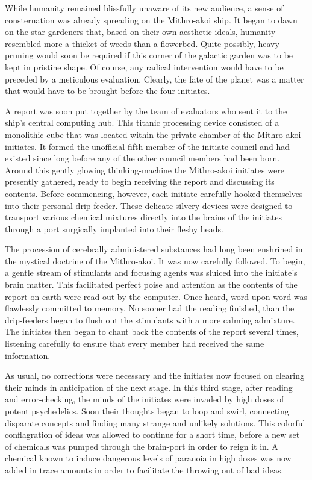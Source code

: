 \documentclass[12pt]{article}
\begin{document}
While humanity remained blissfully unaware of its new audience,
a sense of consternation was already spreading on the Mithro-akoi ship.
It began to dawn on the star gardeners that,
based on their own aesthetic ideals,
humanity resembled more a thicket of weeds than a flowerbed.
Quite possibly, heavy pruning would soon be required if this corner of the galactic garden was to be kept in pristine shape.
Of course, any radical intervention would have to be preceded by a meticulous evaluation.
Clearly, the fate of the planet was a matter that would have to be brought before the four initiates.

A report was soon put together by the team of evaluators who sent it to the ship's central computing hub.
This titanic processing device consisted of a monolithic cube that was located within the private chamber of the Mithro-akoi initiates.
It formed the unofficial fifth member of the initiate council and had existed since long before any of the other council members had been born.
Around this gently glowing thinking-machine the Mithro-akoi initiates were presently gathered, ready to begin receiving the report and discussing its contents.
Before commencing, however, each initiate carefully hooked themselves into their personal drip-feeder.
These delicate silvery devices were designed to transport various chemical mixtures directly into the brains of the initiates through a port surgically implanted into their fleshy heads.

The procession of cerebrally administered substances had long been enshrined in the mystical doctrine of the Mithro-akoi.
It was now carefully followed.
To begin, a gentle stream of stimulants and focusing agents was sluiced into the initiate's brain matter.
This facilitated perfect poise and attention as the contents of the report on earth were read out by the computer.
Once heard, word upon word was flawlessly committed to memory.
No sooner had the reading finished,
than the drip-feeders began to flush out the stimulants with a more calming admixture.
The initiates then began to chant back the contents of the report several times, listening carefully to ensure that every member had received the same information.

As usual, no corrections were necessary and the initiates now focused on clearing their minds in anticipation of the next stage.
In this third stage, after reading and error-checking, 
the minds of the initiates were invaded by high doses of potent psychedelics.
Soon their thoughts began to loop and swirl, connecting disparate concepts and finding many strange and unlikely solutions.
This colorful conflagration of ideas was allowed to continue for a short time,
before a new set of chemicals was pumped through the brain-port in order to reign it in.
A chemical known to induce dangerous levels of paranoia in high doses was now added in trace amounts in order to facilitate the throwing out of bad ideas.
\end{document}
